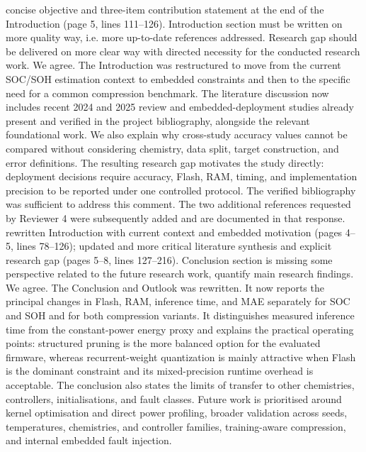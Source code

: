 {} concise objective and three-item contribution statement at the end of the Introduction (page 5, lines 111--126).\markdownRendererInterblockSeparator
{}
\markdownRendererSectionEnd \markdownRendererSectionBegin
{}\markdownRendererInterblockSeparator
{}\markdownRendererBlockQuoteBegin
Introduction section must be written on more quality way, i.e. more up-to-date references addressed. Research gap should be delivered on more clear way with directed necessity for the conducted research work.\markdownRendererBlockQuoteEnd \markdownRendererInterblockSeparator
{} We agree. The Introduction was restructured to move from the current SOC/SOH estimation context to embedded constraints and then to the specific need for a common compression benchmark. The literature discussion now includes recent 2024 and 2025 review and embedded-deployment studies already present and verified in the project bibliography, alongside the relevant foundational work. We also explain why cross-study accuracy values cannot be compared without considering chemistry, data split, target construction, and error definitions. The resulting research gap motivates the study directly: deployment decisions require accuracy, Flash, RAM, timing, and implementation precision to be reported under one controlled protocol. The verified bibliography was sufficient to address this comment. The two additional references requested by Reviewer 4 were subsequently added and are documented in that response.\markdownRendererParagraphSeparator
{} rewritten Introduction with current context and embedded motivation (pages 4--5, lines 78--126); updated and more critical literature synthesis and explicit research gap (pages 5--8, lines 127--216).\markdownRendererInterblockSeparator
{}
\markdownRendererSectionEnd \markdownRendererSectionBegin
{}\markdownRendererInterblockSeparator
{}\markdownRendererBlockQuoteBegin
Conclusion section is missing some perspective related to the future research work, quantify main research findings.\markdownRendererBlockQuoteEnd \markdownRendererInterblockSeparator
{} We agree. The Conclusion and Outlook was rewritten. It now reports the principal changes in Flash, RAM, inference time, and MAE separately for SOC and SOH and for both compression variants. It distinguishes measured inference time from the constant-power energy proxy and explains the practical operating points: structured pruning is the more balanced option for the evaluated firmware, whereas recurrent-weight quantization is mainly attractive when Flash is the dominant constraint and its mixed-precision runtime overhead is acceptable. The conclusion also states the limits of transfer to other chemistries, controllers, initialisations, and fault classes. Future work is prioritised around kernel optimisation and direct power profiling, broader validation across seeds, temperatures, chemistries, and controller families, training-aware compression, and internal embedded fault injection.\markdownRendererParagraphSeparator

